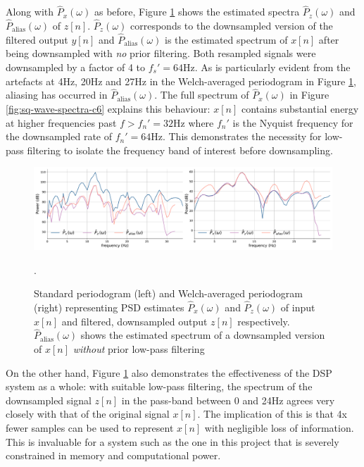 Along with $\hat{P}_x(\omega)$ as before, Figure \ref{fig:sq-wave-ds-spectra-c6} shows the estimated spectra $\hat{P}_z(\omega)$ and $\hat{P}_\text{alias}(\omega)$ of $z[n]$. $\hat{P}_z(\omega)$ corresponds to the downsampled version of the filtered output $y[n]$ and $\hat{P}_\text{alias}(\omega)$ is the estimated spectrum of $x[n]$ after being downsampled with \textit{no} prior filtering. Both resampled signals were downsampled by a factor of 4 to $f_s'=64$Hz. As is particularly evident from the artefacts at 4Hz, 20Hz and 27Hz in the Welch-averaged periodogram in Figure \ref{fig:sq-wave-ds-spectra-c6}, aliasing has occurred in $\hat{P}_\text{alias}(\omega)$. The full spectrum of $\hat{P}_x(\omega)$ in Figure \ref{fig:sq-wave-spectra-c6} explains this behaviour: $x[n]$ contains substantial energy at higher frequencies past $f>f_n'=32$Hz where $f_n'$ is the Nyquist frequency for the downsampled rate of $f_n'=64$Hz. This demonstrates the necessity for low-pass filtering to isolate the frequency band of interest before downsampling. 
\begin{figure}[h]
    \centering
    \includegraphics[width=\textwidth]{sq_wave_filtering_ds_spectra}
    \caption[PSD estimates of an input signal, filtered and downsampled version and a downsampled version without filtering.]{Standard periodogram (left) and Welch-averaged periodogram (right) representing PSD estimates $\hat{P}_x(\omega)$ and $\hat{P}_z(\omega)$ of input $x[n]$ and filtered, downsampled output $z[n]$ respectively. $\hat{P}_{\text{alias}}(\omega)$ shows the estimated spectrum of a downsampled version of $x[n]$ \textit{without} prior low-pass filtering}.
    \label{fig:sq-wave-ds-spectra-c6}
\end{figure}
On the other hand, Figure \ref{fig:sq-wave-ds-spectra-c6} also demonstrates the effectiveness of the DSP system as a whole: with suitable low-pass filtering, the spectrum of the downsampled signal $z[n]$ in the pass-band between 0 and 24Hz agrees very closely with that of the original signal $x[n]$. The implication of this is that 4x fewer samples can be used to represent $x[n]$ with negligible loss of information. This is invaluable for a system such as the one in this project that is severely constrained in memory and computational power.


